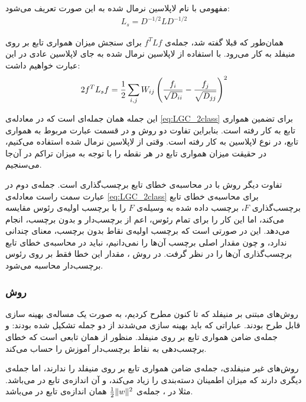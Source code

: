 \documentclass[11pt]{article}
\begin{document}
مفهومی با نام لاپلاسین نرمال شده به این صورت تعریف می‌شود: 
\begin{eqnarray}
L_s = D^{-1/2}LD^{-1/2}
\end{eqnarray}

همان‌طور که قبلا گفته شد، جمله‌ی $f^TLf$ برای سنجش میزان همواری تابع بر روی منیفلد به کار می‌رود.
با استفاده از لاپلاسین نرمال شده به جای لاپلاسین عادی در این عبارت خواهیم داشت:
\begin{eqnarray}
2f^T L_s f = {1\over 2}\displaystyle \sum_{i,j}W_{ij}\left({f_i \over \sqrt{D_{ii}}}-{f_j \over \sqrt{D_{jj}}}\right)^2
\end{eqnarray}

این جمله همان جمله‌ای است که در معادله‌ی \ref{eq:LGC_2class} برای تضمین همواری تابع به کار رفته است. بنابراین تفاوت دو روش \LGC{} و \regularization{} \tikhonov{} در قسمت عبارت مربوط به همواری تابع، در نوع لاپلاسین به کار رفته است. وقتی از لاپلاسین نرمال شده استفاده می‌کنیم، در حقیقت میزان همواری تابع در هر نقطه را با توجه به میزان تراکم در آن‌جا می‌سنجیم.

تفاوت دیگر روش \LGC{} با \regularization{} \tikhonov{} در محاسبه‌ی خطای تابع برچسب‌گذاری است. جمله‌ی دوم در عبارت سمت راست معادله‌ی \ref{eq:LGC_2class}  برای محاسبه‌ی خطای تابع برچسب‌گذاری $F$، برچسب داده شده به وسیله‌ی $F$ را با برچسب اولیه‌ی رئوس مقایسه می‌کند، اما این کار را برای تمام رئوس، اعم از برچسب‌دار و بدون برچسب، انجام می‌دهد. این در صورتی است که برچسب اولیه‌ی نقاط بدون برچسب، معنای چندانی ندارد، و چون مقدار اصلی برچسب آن‌ها را نمی‌دانیم، نباید در محاسبه‌ی خطای تابع برچسب‌گذاری آن‌ها را در نظر گرفت. در روش \regularization{} \tikhonov{}، مقدار این خطا فقط بر روی رئوس برچسب‌دار محاسبه می‌شود.


\subsubsection*{روش \LapSVM}


 روش‌های مبتنی بر منیفلد که تا کنون مطرح کردیم، به صورت یک مساله‌ی بهینه سازی قابل طرح بودند. عباراتی که باید بهینه سازی می‌شدند از دو جمله تشکیل شده بودند: \lossfunction{} و جمله‌ی ضامن همواری تابع بر روی منیفلد. منظور از \lossfunction{} همان تابعی است که خطای برچسب‌دهی به نقاط برچسب‌دار آموزش را حساب می‌کند.

روش‌های غیر منیفلدی، جمله‌ی ضامن همواری تابع بر روی منیفلد را ندارند، اما جمله‌ی دیگری دارند که میزان اطمینان	 دسته‌بندی را زیاد می‌کند، و آن اندازه‌ی تابع در \RKHS{} می‌باشد. مثلا در \SVM{}، جمله‌ی ${1 \over 2} \Vert w \Vert ^ 2$ همان اندازه‌ی تابع در \RKHS{} می‌باشد.
\end{document}

